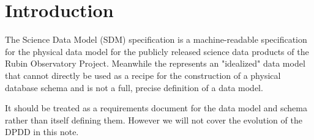 
\section{Introduction}

The Science Data Model (SDM) specification is a machine-readable specification for the physical data model for the publicly released science data products of the Rubin Observatory Project.
Meanwhile the \DPDD  represents an "idealized" data model that cannot directly be used as a recipe for the construction of a physical database schema and is not a full, precise definition of a data model.

It should be treated as a requirements document for the data model and schema rather than itself defining them. However we will not cover the evolution of the DPDD in this note.


